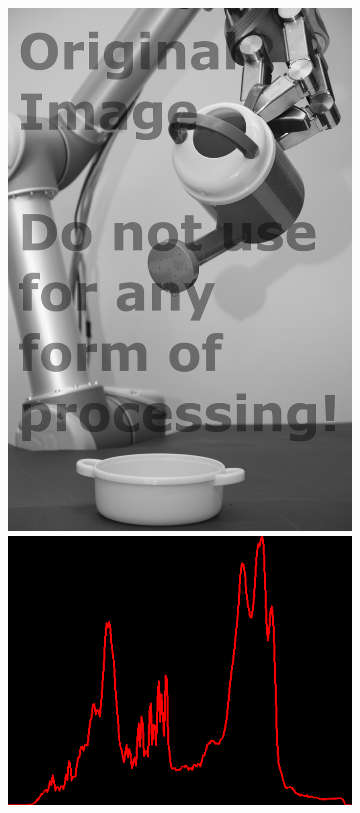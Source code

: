 \begin{figure}[H]
\begin{subfigure}[b]{0.28\textwidth}
        \label{fig:img2_kernel11}
    \end{subfigure}
    \begin{subfigure}[b]{0.28\textwidth}
        \includegraphics[width=\textwidth]{org.png}\\[0.1cm]
        \includegraphics[width=\textwidth]{img2/hist_eee_org_res_total.png}

\end{subfigure}
\end{figure}
